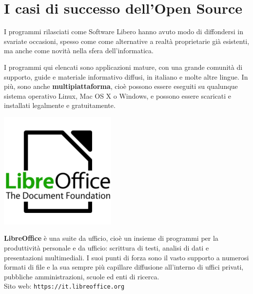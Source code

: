 \documentclass[a4paper, 12pt]{extarticle}
\begin{document}
\section*{I casi di successo dell'Open Source}
I programmi rilasciati come Software Libero hanno avuto modo di
diffondersi in svariate occasioni, spesso come come alternative a
realtà proprietarie già esistenti, ma anche come novità nella sfera
dell'informatica.

I programmi qui elencati sono applicazioni mature, con una grande
comunità di supporto, guide e materiale informativo diffusi, in
italiano e molte altre lingue. In più, sono anche
\textbf{multipiattaforma}, cioè possono essere eseguiti su qualunque
sistema operativo Linux, Mac OS X o Windows, e possono essere scaricati
e installati legalmente e gratuitamente.

\begin{minipage}{.2\linewidth}
    \includegraphics[width=0.9\linewidth]{img/opuscolo-7.png}
\end{minipage}
\begin{minipage}{.75\linewidth}
\textbf{LibreOffice} è una suite da ufficio, cioè un insieme di
programmi per la produttività personale e da ufficio: scrittura di
testi, analisi di dati e presentazioni multimediali. I suoi punti di
forza sono il vasto supporto a numerosi formati di file e la sua sempre
più capillare diffusione all'interno di uffici privati, pubbliche
amministrazioni, scuole ed enti di ricerca.\\
Sito web: \texttt{https://it.libreoffice.org}
\end{minipage}
\end{document}
